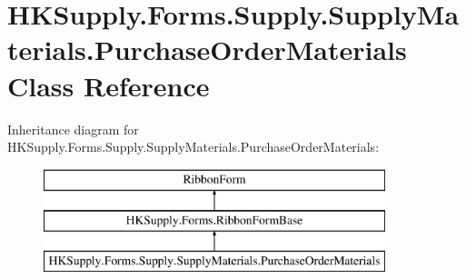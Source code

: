 \hypertarget{class_h_k_supply_1_1_forms_1_1_supply_1_1_supply_materials_1_1_purchase_order_materials}{}\section{H\+K\+Supply.\+Forms.\+Supply.\+Supply\+Materials.\+Purchase\+Order\+Materials Class Reference}
\label{class_h_k_supply_1_1_forms_1_1_supply_1_1_supply_materials_1_1_purchase_order_materials}
Inheritance diagram for H\+K\+Supply.\+Forms.\+Supply.\+Supply\+Materials.\+Purchase\+Order\+Materials\+:\begin{figure}[H]
\begin{center}
\leavevmode
\includegraphics[height=3.000000cm]{class_h_k_supply_1_1_forms_1_1_supply_1_1_supply_materials_1_1_purchase_order_materials}
\end{center}
\end{figure}
